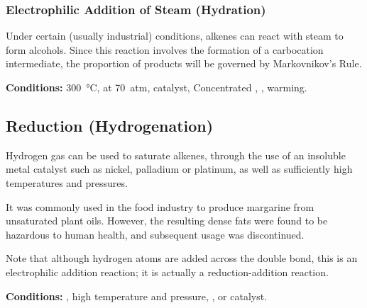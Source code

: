 		\pagebreak
		\subsubsection{Electrophilic Addition of Steam (Hydration)}

			Under certain (usually industrial) conditions, alkenes can react with steam to form alcohols. Since this reaction involves
			the formation of a carbocation intermediate, the proportion of products will be governed by Markovnikov's Rule.

			\vspace{1.5em}
			\vbox{\textbf{Conditions:}	\tabto{35mm}\SI{300}{\celsius}, at \SI{70}{atm},  catalyst, 
										\tabto{35mm}Concentrated , , warming.}






	\subsection{Reduction (Hydrogenation)}

		Hydrogen gas can be used to saturate alkenes, through the use of an insoluble metal catalyst such as nickel, palladium or platinum,
		as well as sufficiently high temperatures and pressures.

		It was commonly used in the food industry to produce margarine from unsaturated plant oils. However, the resulting dense fats were
		found to be hazardous to human health, and subsequent usage was discontinued.

		Note that although hydrogen atoms are added across the double bond, this is  an electrophilic addition reaction; it
		is actually a reduction-addition reaction.

		\vspace{1.5em}
		\vbox{\textbf{Conditions:}	\tabto{35mm}, high temperature and pressure, ,  or  catalyst.}




